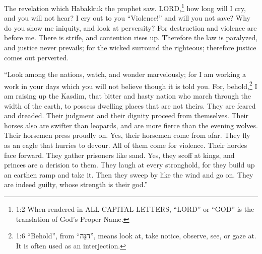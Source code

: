
 



\vspace{-1.36in}

\mychapter{} \myverse*{}The revelation which Habakkuk the prophet saw. \myverse{}LORD,\footnote{1:2 When rendered in ALL CAPITAL LETTERS, “LORD” or “GOD” is the translation of God’s Proper Name.} how long will I cry, and you will not hear? I cry out to you “Violence!” and will you not save? \myverse{}Why do you show me iniquity, and look at perversity? For destruction and violence are before me. There is strife, and contention rises up. \myverse{}Therefore the law is paralyzed, and justice never prevails; for the wicked surround the righteous; therefore justice comes out perverted.


\myverse{}“Look among the nations, watch, and wonder marvelously; for I am working a work in your days which you will not believe though it is told you. \myverse{}For, behold,\footnote{1:6 “Behold”, from “הִנֵּה”, means look at, take notice, observe, see, or gaze at. It is often used as an interjection.} I am raising up the Kasdim, that bitter and hasty nation who march through the width of the earth, to possess dwelling places that are not theirs. \myverse{}They are feared and dreaded. Their judgment and their dignity proceed from themselves. \myverse{}Their horses also are swifter than leopards, and are more fierce than the evening wolves. Their horsemen press proudly on. Yes, their horsemen come from afar. They fly as an eagle that hurries to devour. \myverse{}All of them come for violence. Their hordes face forward. They gather prisoners like sand. \myverse{}Yes, they scoff at kings, and princes are a derision to them. They laugh at every stronghold, for they build up an earthen ramp and take it. \myverse{}Then they sweep by like the wind and go on. They are indeed guilty, whose strength is their god.”


